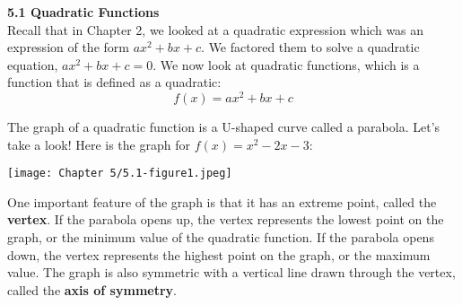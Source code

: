 \documentclass[12pt]{book}
\begin{document}
\begin{comment}
Name: \underline{\hspace{100mm}}
\vspace{20mm}
  \centerline{\Large \textbf{Chapter 2: Equations and Inequalities} } 

{\large
\begin{center}
\begin{varwidth}{\textwidth}
\begin{enumerate}[2.1]
    \item The Regular Coordinate System and Graphs
    \item Linear Equations in One Variable
    \item Models and  Applications (Skipping)
    \item Complex Numbers
    \item Quadratic Equations
    \item Other Types of Equations
    \item Linear Inequalities and Absolute Value Inequalities
\end{enumerate}
\end{varwidth}
\end{center}

}
\newpage  
\end{comment}

{\large \textbf{5.1 Quadratic Functions}}
\\
Recall that in Chapter 2, we looked at a quadratic expression which was an expression of the form $ax^2+bx+c$. We factored them to solve a quadratic equation, $ax^2+bx+c=0$. We now look at quadratic functions, which is a function that is defined as a quadratic: $$ f (x) = ax^2 + bx + c$$

The graph of a quadratic function is a U-shaped curve called a parabola. Let's take a look!
Here is the graph for $f(x)=x^2-2x-3$:
\vspace{3mm}

\centerline{\texttt{[image: Chapter 5/5.1-figure1.jpeg]}}




One important feature of the graph is that it has an extreme point, called the \textbf{vertex}. If the parabola opens up, the vertex represents the lowest point on the graph, or the minimum value of the quadratic function. If the parabola opens down, the vertex represents the highest point on the graph, or the maximum value. The graph is also symmetric with a vertical line drawn through the vertex, called the \textbf{axis of symmetry}.
\end{document}

